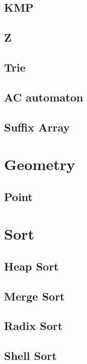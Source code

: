 \documentclass[a4paper,10pt,twocolumn,oneside]{article}
\begin{document}
\subsection{KMP}

\subsection{Z}

\subsection{Trie}

\subsection{AC automaton}

\subsection{Suffix Array}

\newpage

\section{Geometry}
\subsection{Point}

\newpage

\section{Sort}
\subsection{Heap Sort}

\subsection{Merge Sort}

\subsection{Radix Sort}

\subsection{Shell Sort}

\newpage
\end{document}
